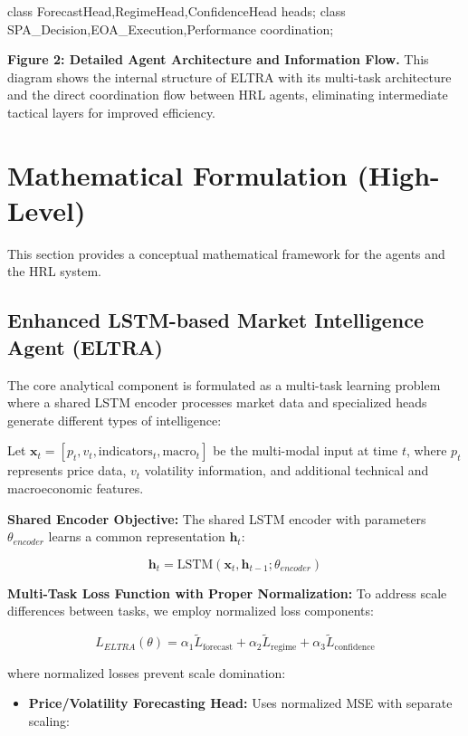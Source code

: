 \documentclass[11pt,a4paper]{article}
\begin{document}
    class ForecastHead,RegimeHead,ConfidenceHead heads;
    class SPA\_Decision,EOA\_Execution,Performance coordination;

\textbf{Figure 2: Detailed Agent Architecture and Information Flow.} This diagram shows the internal structure of ELTRA with its multi-task architecture and the direct coordination flow between HRL agents, eliminating intermediate tactical layers for improved efficiency.

\section{Mathematical Formulation (High-Level)}

This section provides a conceptual mathematical framework for the agents and the HRL system.

\subsection{Enhanced LSTM-based Market Intelligence Agent (ELTRA)}

The core analytical component is formulated as a multi-task learning problem where a shared LSTM encoder processes market data and specialized heads generate different types of intelligence:

Let $\mathbf{x}_t = [p_t, v_t, \text{indicators}_t, \text{macro}_t]$ be the multi-modal input at time $t$, where $p_t$ represents price data, $v_t$ volatility information, and additional technical and macroeconomic features.

\textbf{Shared Encoder Objective:}
The shared LSTM encoder with parameters $\theta_{encoder}$ learns a common representation $\mathbf{h}_t$:

\begin{equation}
\mathbf{h}_t = \text{LSTM}(\mathbf{x}_t, \mathbf{h}_{t-1}; \theta_{encoder})
\end{equation}

\textbf{Multi-Task Loss Function with Proper Normalization:}
To address scale differences between tasks, we employ normalized loss components:

\begin{equation}
L_{ELTRA}(\theta) = \alpha_1 \tilde{L}_{\text{forecast}} + \alpha_2 \tilde{L}_{\text{regime}} + \alpha_3 \tilde{L}_{\text{confidence}}
\end{equation}

where normalized losses prevent scale domination:

\begin{itemize}
\item   \textbf{Price/Volatility Forecasting Head:} Uses normalized MSE with separate scaling:
\end{itemize}
   \1
\end{document}
